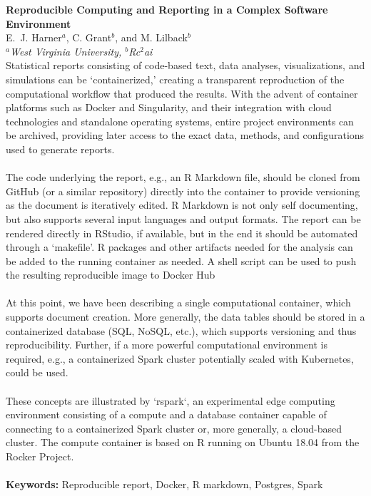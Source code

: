 
\setlength{\textwidth}{160mm}\setlength{\textheight}{240mm}
\setlength{\oddsidemargin}{0mm}\setlength{\evensidemargin}{0mm}
\setlength{\topmargin}{-10mm}
\setlength{\parindent}{0mm} 
\pagestyle{empty}	%



{\Large\bf Reproducible Computing and Reporting in a Complex Software Environment}\\[4mm]

E.~J. Harner$^a$, C. Grant$^b$, and  M. Lilback$^b$\\ 				

{\small \em $^a$West Virginia University, $^b$Rc$^2$ai}\\[3mm]

Statistical reports consisting of code-based text, data analyses, visualizations, and simulations can be `containerized,' creating a transparent reproduction of the computational workflow that produced the results. With the advent of container platforms such as Docker and Singularity, and their integration with cloud technologies and standalone operating systems, entire project environments can be archived, providing later access to the exact data, methods, and configurations used to generate  reports.\\
\\
The code underlying the report, e.g., an R Markdown file, should be cloned from GitHub (or a similar repository) directly into the container to provide versioning as the document is iteratively edited. R Markdown is not only self documenting, but also supports several input languages and output formats. The report can be rendered directly in RStudio, if available, but in the end it should be automated through a `makefile'. R packages and other artifacts needed for the analysis can be added to the running container as needed. A shell script can be used to push the resulting reproducible image to Docker Hub\\
\\
At this point, we have been describing a single computational container, which supports document creation. More generally, the data tables should be stored in a containerized database (SQL, NoSQL, etc.), which supports versioning and thus reproducibility. Further, if a more powerful computational environment is required, e.g., a containerized Spark cluster potentially scaled with Kubernetes, could be used.\\
\\
These concepts are illustrated by `rspark`, an experimental edge computing environment consisting of a compute and a database container capable of connecting to a containerized Spark cluster or, more generally, a cloud-based cluster. The compute container is based on R running on Ubuntu 18.04 from the Rocker Project.\\
\\
\textbf{Keywords:} Reproducible report, Docker, R markdown, Postgres, Spark


